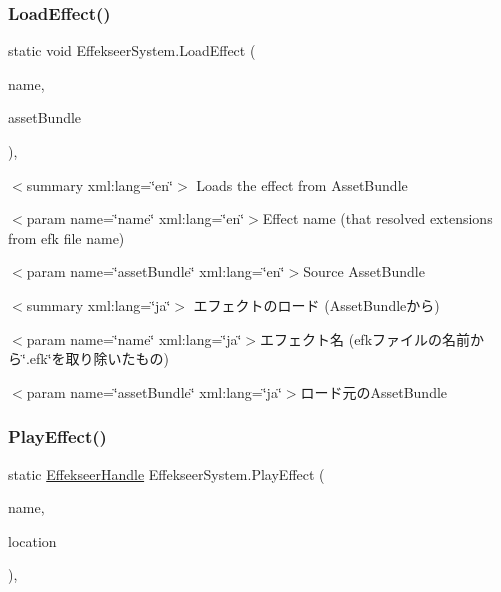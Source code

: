 \subsubsection{\texorpdfstring{Load\+Effect()}{LoadEffect()}\hspace{0.1cm}{\footnotesize\ttfamily [2/2]}}
{\footnotesize\ttfamily static void Effekseer\+System.\+Load\+Effect (\begin{DoxyParamCaption}\item[{string}]{name,  }\item[{Asset\+Bundle}]{asset\+Bundle }\end{DoxyParamCaption})\hspace{0.3cm}{\ttfamily [inline]}, {\ttfamily [static]}}

$<$summary xml\+:lang=\char`\"{}en\char`\"{}$>$ Loads the effect from Asset\+Bundle 

$<$param name=\char`\"{}name\char`\"{} xml\+:lang=\char`\"{}en\char`\"{}$>$Effect name (that resolved extensions from efk file name)

$<$param name=\char`\"{}asset\+Bundle\char`\"{} xml\+:lang=\char`\"{}en\char`\"{}$>$Source Asset\+Bundle

$<$summary xml\+:lang=\char`\"{}ja\char`\"{}$>$ エフェクトのロード (Asset\+Bundleから) 

$<$param name=\char`\"{}name\char`\"{} xml\+:lang=\char`\"{}ja\char`\"{}$>$エフェクト名 (efkファイルの名前から\char`\"{}.\+efk\char`\"{}を取り除いたもの)

$<$param name=\char`\"{}asset\+Bundle\char`\"{} xml\+:lang=\char`\"{}ja\char`\"{}$>$ロード元の\+Asset\+Bundle\mbox{\label{class_effekseer_system_a8d0a7561a512b64acce39c4456ff6f37}} 
\subsubsection{\texorpdfstring{Play\+Effect()}{PlayEffect()}}
{\footnotesize\ttfamily static \hyperlink{struct_effekseer_handle}{Effekseer\+Handle} Effekseer\+System.\+Play\+Effect (\begin{DoxyParamCaption}\item[{string}]{name,  }\item[{Vector3}]{location }\end{DoxyParamCaption})\hspace{0.3cm}{\ttfamily [inline]}, {\ttfamily [static]}}

